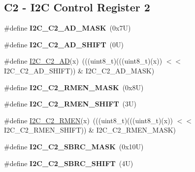 \subsection*{C2 -\/ I2C Control Register 2}
\begin{DoxyCompactItemize}
\item 
\mbox{\label{group___i2_c___register___masks_ga6c5f8db3bac4c51de9446448a8ad9072}} 
\#define {\bfseries I2\+C\+\_\+\+C2\+\_\+\+A\+D\+\_\+\+M\+A\+SK}~(0x7\+U)
\item 
\mbox{\label{group___i2_c___register___masks_gab875d484e12dc6ae427c2063430d1362}} 
\#define {\bfseries I2\+C\+\_\+\+C2\+\_\+\+A\+D\+\_\+\+S\+H\+I\+FT}~(0\+U)
\item 
\#define \mbox{\hyperlink{group___i2_c___register___masks_gaa19edf20551c0d4dc70b840c2c5b7e24}{I2\+C\+\_\+\+C2\+\_\+\+AD}}(x)~(((uint8\+\_\+t)(((uint8\+\_\+t)(x)) $<$$<$ I2\+C\+\_\+\+C2\+\_\+\+A\+D\+\_\+\+S\+H\+I\+FT)) \& I2\+C\+\_\+\+C2\+\_\+\+A\+D\+\_\+\+M\+A\+SK)
\item 
\mbox{\label{group___i2_c___register___masks_ga70911373d5619a4d8376777446085856}} 
\#define {\bfseries I2\+C\+\_\+\+C2\+\_\+\+R\+M\+E\+N\+\_\+\+M\+A\+SK}~(0x8\+U)
\item 
\mbox{\label{group___i2_c___register___masks_ga802a10e2d279895ec0230b4701b1a4bf}} 
\#define {\bfseries I2\+C\+\_\+\+C2\+\_\+\+R\+M\+E\+N\+\_\+\+S\+H\+I\+FT}~(3\+U)
\item 
\#define \mbox{\hyperlink{group___i2_c___register___masks_gaecaecedb471207c255fe346e6158cdef}{I2\+C\+\_\+\+C2\+\_\+\+R\+M\+EN}}(x)~(((uint8\+\_\+t)(((uint8\+\_\+t)(x)) $<$$<$ I2\+C\+\_\+\+C2\+\_\+\+R\+M\+E\+N\+\_\+\+S\+H\+I\+FT)) \& I2\+C\+\_\+\+C2\+\_\+\+R\+M\+E\+N\+\_\+\+M\+A\+SK)
\item 
\mbox{\label{group___i2_c___register___masks_gad5acb46182264a92f1f7ca818146d44e}} 
\#define {\bfseries I2\+C\+\_\+\+C2\+\_\+\+S\+B\+R\+C\+\_\+\+M\+A\+SK}~(0x10\+U)
\item 
\mbox{\label{group___i2_c___register___masks_ga620079dc18e7ce504b6092503a10d2ae}} 
\#define {\bfseries I2\+C\+\_\+\+C2\+\_\+\+S\+B\+R\+C\+\_\+\+S\+H\+I\+FT}~(4\+U)

\end{DoxyCompactItemize}
